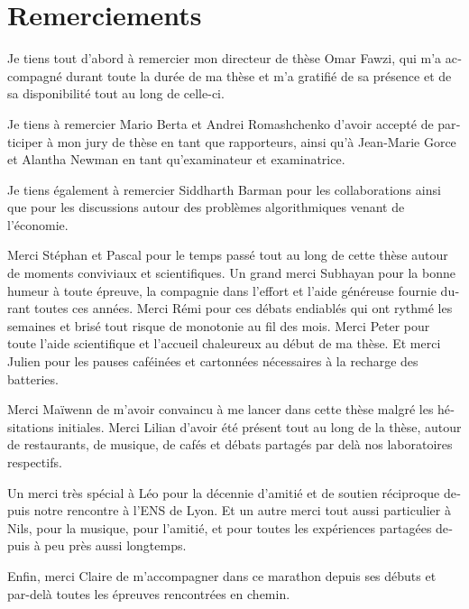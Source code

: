 \thispagestyle{empty}
\chapter*{Remerciements}

\begin{otherlanguage}{french}
  Je tiens tout d'abord à remercier mon directeur de thèse Omar Fawzi, qui m'a accompagné durant toute la durée de ma thèse et m'a gratifié de sa présence et de sa disponibilité tout au long de celle-ci.

  Je tiens à remercier Mario Berta et Andrei Romashchenko d'avoir accepté de participer à mon jury de thèse en tant que rapporteurs, ainsi qu'à Jean-Marie Gorce et Alantha Newman en tant qu'examinateur et examinatrice.

  Je tiens également à remercier Siddharth Barman pour les collaborations ainsi que pour les discussions autour des problèmes algorithmiques venant de l'économie.

  Merci Stéphan et Pascal pour le temps passé tout au long de cette thèse autour de moments conviviaux et scientifiques. Un grand merci Subhayan pour la bonne humeur à toute épreuve, la compagnie dans l'effort et l'aide généreuse fournie durant toutes ces années. Merci Rémi pour ces débats endiablés qui ont rythmé les semaines et brisé tout risque de monotonie au fil des mois. Merci Peter pour toute l'aide scientifique et l'accueil chaleureux au début de ma thèse. Et merci Julien pour les pauses caféinées et cartonnées nécessaires à la recharge des batteries.

  Merci Maïwenn de m'avoir convaincu à me lancer dans cette thèse malgré les hésitations initiales. Merci Lilian d'avoir été présent tout au long de la thèse, autour de restaurants, de musique, de cafés et débats partagés par delà nos laboratoires respectifs.

  Un merci très spécial à Léo pour la décennie d'amitié et de soutien réciproque depuis notre rencontre à l'ENS de Lyon. Et un autre merci tout aussi particulier à Nils, pour la musique, pour l'amitié, et pour toutes les expériences partagées depuis à peu près aussi longtemps.

  Enfin, merci Claire de m'accompagner dans ce marathon depuis ses débuts et par-delà toutes les épreuves rencontrées en chemin.
\end{otherlanguage}
 
